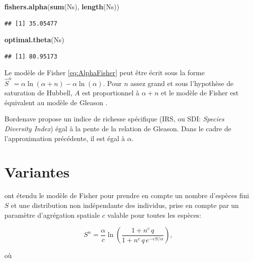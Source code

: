 \documentclass[
  11pt,
  french,
  a4paper,
  extrafontsizes,onecolumn,openright
  ]{memoir}
\newenvironment{Shaded}{\begin{snugshade}}{\end{snugshade}}
\newcommand{\FunctionTok}[1]{\textcolor[rgb]{0.13,0.29,0.53}{\textbf{#1}}}
\newcommand{\NormalTok}[1]{#1}
\begin{document}
\begin{Shaded}
\begin{Highlighting}[]
\FunctionTok{fishers.alpha}\NormalTok{(}\FunctionTok{sum}\NormalTok{(Ns), }\FunctionTok{length}\NormalTok{(Ns))}
\end{Highlighting}
\end{Shaded}

\begin{verbatim}
## [1] 35.05477
\end{verbatim}

\begin{Shaded}
\begin{Highlighting}[]
\FunctionTok{optimal.theta}\NormalTok{(Ns)}
\end{Highlighting}
\end{Shaded}

\begin{verbatim}
## [1] 80.95173
\end{verbatim}

\normalsize

Le modèle de Fisher \eqref{eq:AlphaFisher} peut être écrit sous la forme \(\hat{S}^{n} = \alpha{\ln\left(\alpha+n\right)}-\alpha\ln\left(\alpha\right)\).
Pour \(n\) assez grand et sous l'hypothèse de saturation de Hubbell\autocite{Hubbell2001}, \(A\) est proportionnel à \(\alpha+n\) et le modèle de Fisher est équivalent au modèle de Gleason \autocite{Engen1977}.

Bordenave \autocite{Bordenave1998,Bordenave2011} propose un indice de richesse spécifique (IRS, ou SDI: \emph{Species Diversity Index}) égal à la pente de la relation de Gleason.
Dans le cadre de l'approximation précédente, il est égal à \(\alpha\).

\section{Variantes}\label{variantes}

\textcite{Schulte2005} ont étendu le modèle de Fisher pour prendre en compte un nombre d'espèces fini \(S\) et une distribution non indépendante des individus, prise en compte par un paramètre d'agrégation spatiale \(c\) valable pour toutes les espèces:

\begin{equation} 
  \label{eq:Schulte}
  S^{n} = \frac{\alpha}{c} \ln\left(\frac{1+ n^c\,q}{1+ n^c\,q\,e^{-cS/\alpha}}\right),
\end{equation}

où
\end{document}
